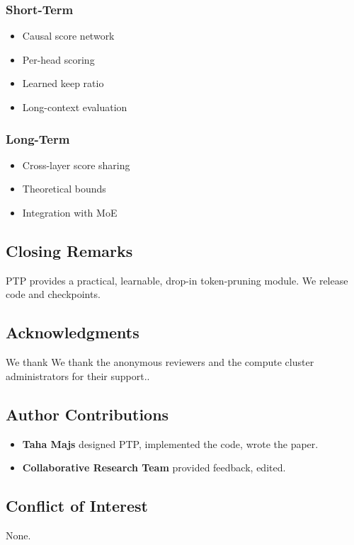 \subsubsection{Short-Term}
\begin{itemize}
\item Causal score network
\item Per-head scoring
\item Learned keep ratio
\item Long-context evaluation

\end{itemize}
\subsubsection{Long-Term}
\begin{itemize}
\item Cross-layer score sharing
\item Theoretical bounds
\item Integration with MoE

\end{itemize}
\subsection{Closing Remarks}

PTP provides a practical, learnable, drop-in token-pruning module. We 
release code and checkpoints.

\subsection{Acknowledgments}

We thank We thank the anonymous reviewers and the compute cluster administrators for their support..

\subsection{Author Contributions}

\begin{itemize}
\item \textbf{Taha Majs} designed PTP, implemented the code, wrote the paper.
\item \textbf{Collaborative Research Team} provided feedback, edited.

\end{itemize}
\subsection{Conflict of Interest}

None.

